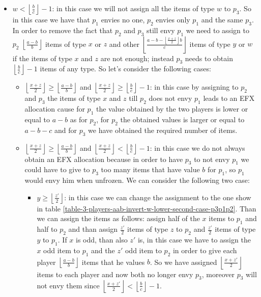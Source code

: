 \documentclass{article}
\newcommand{\floor}[3][2]{\left \lfloor\frac{#2}{#3}\right \rfloor}
\begin{document}
\begin{itemize}
    \item $w < \left \lfloor \frac{b}{c}\right \rfloor - 1 $: in this case we will not assign all the items of type $w$ to $p_3$. So in this case we have that $p_1$ envies no one, $p_2$ envies only $p_1$ and the same $p_3$. In order to remove the fact that $p_2$ and $p_3$ still envy $p_1$ we need to assign to $p_2$ $\left \lfloor \frac{a-b}{b} \right \rfloor $ items of type $x$ or $z$ and other $\left \lfloor \frac{a-b - \floor{x+z}{2}b}{c} \right \rfloor$ items of type $y$ or $w$ if the items of type $x$ and $z$ are not enough; instead $p_3$ needs to obtain $\left\lfloor \frac{b}{c}\right \rfloor -1$ items of any type. So let's consider the following cases:
    \begin{itemize}
        \item $\left \lfloor \frac{x+z}{2} \right \rfloor\ge \left \lfloor \frac{a-b}{b} \right \rfloor$ and $\left \lfloor \frac{x+z}{2} \right \rfloor\ge \left\lfloor \frac{b}{c}\right \rfloor -1 $: in this case by assigning to $p_2$ and $p_3$ the items of type $x$ and $z$ till $p_2$ does not envy $p_1$ leads to an EFX allocation cause for $p_1$ the value obtained by the two players is lower or equal to $a-b$ as for $p_2$, for $p_2$ the obtained values is larger or equal to $a-b-c$ and for $p_3$ we have obtained the required number of items. 
         \item $\left \lfloor \frac{x+z}{2} \right \rfloor\ge \left \lfloor \frac{a-b}{b} \right \rfloor$ and $\left \lfloor \frac{x+z}{2} \right \rfloor< \left\lfloor \frac{b}{c}\right \rfloor -1 $: in this case we do not always obtain an EFX allocation because in order to have $p_3$ to not envy $p_1$ we could have to give to $p_3$ too many items that have value $b$ for $p_1$, so $p_1$ would envy him when unfrozen. 
         We can consider the following two case:
         \begin{itemize}
            \item $y\ge \floor{z'}{2}$: in this case we can change the assignment to the one show in table \ref{table-3-players-aab-invert-w-lower-second-case-p3p1p2}. Than we can assign the items as follows: assign half of the $x$ items to $p_1$ and half to $p_2$ and than assign $\frac{z'}{2}$ items of type $z$ to $p_2$ and $\frac{z'}{2}$ items of type $y$ to $p_1$. If $x$ is odd, than also $z'$ is, in this case we have to assign the $x$ odd item to $p_1$ and the $z'$ odd item to $p_2$ in order to give each player $\floor{a-b}{b}$ items that he values $b$. So we have assigned $\floor{x+z'}{2}$ items to each player and now both no longer envy $p_3$, moreover $p_3$ will not envy them since $\floor{x+z'}{2} < \floor{b}{c} - 1$.

\end{itemize}
\end{itemize}
\end{itemize}
\end{document}
